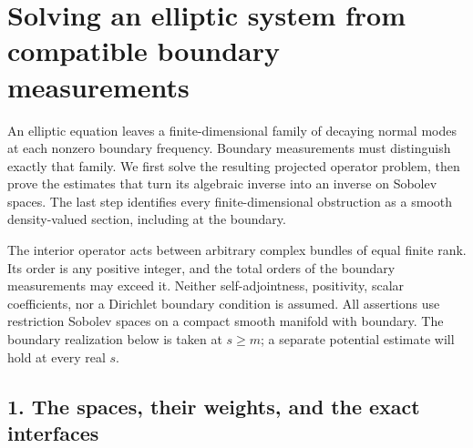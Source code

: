 \documentclass[
  11pt,
]{article}
\author{}
\date{}
\makeatletter
\let\ReaderOriginalAnchorStart\hyper@anchorstart
\let\ReaderOriginalAnchorEnd\hyper@anchorend
\let\ReaderPendingAliases\@empty
\def\ReaderArmAliases#1{\gdef\ReaderPendingAliases{#1}}
\def\hyper@anchorstart#1{\ReaderIfNativeAnchorTF{#1}{\ReaderPendingAliases\global\let\ReaderPendingAliases\@empty}{}\ReaderOriginalAnchorStart{#1}}
\makeatother
\begin{document}
\ReaderArmAliases{\ReaderOriginalAnchorStart{solving-an-elliptic-system-from-compatible-boundary-measurements}\ReaderOriginalAnchorEnd}
\section{Solving an elliptic system from compatible boundary
measurements}\label{solving-an-elliptic-system-from-compatible-boundary-measurements}

An elliptic equation leaves a finite-dimensional family of decaying
normal modes at each nonzero boundary frequency. Boundary measurements
must distinguish exactly that family. We first solve the resulting
projected operator problem, then prove the estimates that turn its
algebraic inverse into an inverse on Sobolev spaces. The last step
identifies every finite-dimensional obstruction as a smooth
density-valued section, including at the boundary.

The interior operator acts between arbitrary complex bundles of equal
finite rank. Its order is any positive integer, and the total orders of
the boundary measurements may exceed it. Neither self-adjointness,
positivity, scalar coefficients, nor a Dirichlet boundary condition is
assumed. All assertions use restriction Sobolev spaces on a compact
smooth manifold with boundary. The boundary realization below is taken
at \(s\geq m\); a separate potential estimate will hold at every real
\(s\).

\ReaderArmAliases{\ReaderOriginalAnchorStart{AN03-GFB-001}\ReaderOriginalAnchorEnd\begingroup\expandafter\def\csname @currentHref\endcsname{AN03-GFB-001}\label{AN03-GFB-001}\endgroup\ReaderOriginalAnchorStart{an03-gfb-001-the-spaces-their-weights-and-the-exact-interfaces}\ReaderOriginalAnchorEnd\begingroup\expandafter\def\csname @currentHref\endcsname{an03-gfb-001-the-spaces-their-weights-and-the-exact-interfaces}\label{an03-gfb-001-the-spaces-their-weights-and-the-exact-interfaces}\endgroup\ReaderOriginalAnchorStart{1-the-spaces-their-weights-and-the-exact-interfaces}\ReaderOriginalAnchorEnd\begingroup\expandafter\def\csname @currentHref\endcsname{1-the-spaces-their-weights-and-the-exact-interfaces}\label{1-the-spaces-their-weights-and-the-exact-interfaces}\endgroup\ReaderOriginalAnchorStart{the-spaces-their-weights-and-the-exact-interfaces}\ReaderOriginalAnchorEnd}
\subsection{1. The spaces, their weights, and the exact
interfaces}\label{the-spaces-their-weights-and-the-exact-interfaces}
\end{document}
